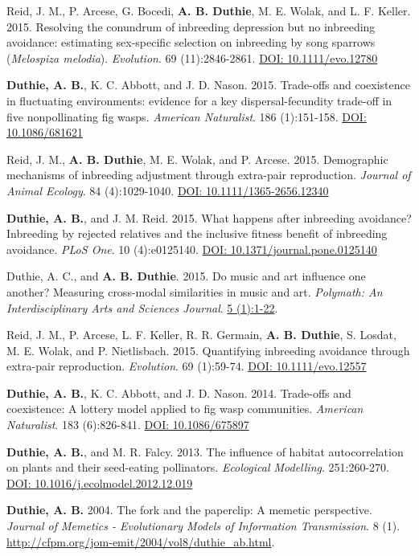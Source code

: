 \documentclass[letterpaper]{article}
\begin{document}
\begin{etaremune}
\item Reid, J. M., P. Arcese, G. Bocedi, {\bf A. B. Duthie}, M. E. Wolak, and L. F. Keller. 2015. Resolving the conundrum of inbreeding depression but no inbreeding avoidance: estimating sex-specific selection on inbreeding by song sparrows ({\it Melospiza melodia}). {\it Evolution}. 69 (11):2846-2861. \href{http://onlinelibrary.wiley.com/doi/10.1111/evo.12780/abstract}{DOI: 10.1111/evo.12780}
\item {\bf Duthie, A. B.}, K. C. Abbott, and J. D. Nason. 2015. Trade-offs and coexistence in fluctuating environments: evidence for a key dispersal-fecundity trade-off in five nonpollinating fig wasps. {\it American Naturalist}. 186 (1):151-158. \href{http://www.jstor.org/stable/10.1086/681621}{DOI: 10.1086/681621}
\item Reid, J. M., {\bf A. B. Duthie}, M. E. Wolak, and P. Arcese. 2015. Demographic mechanisms of inbreeding adjustment through extra-pair reproduction. {\it Journal of Animal Ecology}. 84 (4):1029-1040. \href{http://onlinelibrary.wiley.com/doi/10.1111/1365-2656.12340/abstract}{DOI: 10.1111/1365-2656.12340}
\item {\bf Duthie, A. B.}, and J. M. Reid. 2015. What happens after inbreeding avoidance? Inbreeding by rejected relatives and the inclusive fitness benefit of inbreeding avoidance. {\it PLoS One}. 10 (4):e0125140. \href{http://journals.plos.org/plosone/article?id=10.1371/journal.pone.0125140}{DOI: 10.1371/journal.pone.0125140}
\item Duthie, A. C., and {\bf A. B. Duthie}. 2015. Do music and art influence one another? Measuring cross-modal similarities in music and art. {\it Polymath: An Interdisciplinary Arts and Sciences Journal}. \href{https://ojcs.siue.edu/ojs/index.php/polymath/article/view/3013}{5 (1):1-22}.
\item Reid, J. M., P. Arcese, L. F. Keller, R. R. Germain, {\bf A. B. Duthie}, S. Losdat, M. E. Wolak, and P. Nietlisbach. 2015. Quantifying inbreeding avoidance through extra-pair reproduction. {\it Evolution}. 69 (1):59-74. \href{http://onlinelibrary.wiley.com/doi/10.1111/evo.12557/abstract}{DOI: 10.1111/evo.12557}
\item {\bf Duthie, A. B.}, K. C. Abbott, and J. D. Nason. 2014. Trade-offs and coexistence: A lottery model applied to fig wasp communities. {\it American Naturalist}. 183 (6):826-841. \href{http://www.jstor.org/stable/10.1086/675897}{DOI: 10.1086/675897}
\item {\bf Duthie, A. B.}, and M. R. Falcy. 2013. The influence of habitat autocorrelation on plants and their seed-eating pollinators. {\it Ecological Modelling}. 251:260-270. \href{http://www.sciencedirect.com/science/article/pii/S0304380013000021}{DOI: 10.1016/j.ecolmodel.2012.12.019}
\item {\bf Duthie, A. B.} 2004. The fork and the paperclip: A memetic perspective. {\it Journal of Memetics - Evolutionary Models of Information Transmission}. 8 (1). \href{http://cfpm.org/jom-emit/2004/vol8/duthie_ab.html}{http://cfpm.org/jom-emit/2004/vol8/duthie\_ab.html}.
\end{etaremune}
\end{document}
